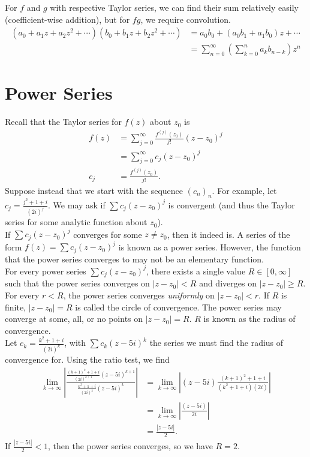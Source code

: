 \documentclass[10pt]{extarticle}
\begin{document}
  For $f$ and $g$ with respective Taylor series, we can find their sum relatively easily (coefficient-wise addition), but for $fg$, we require convolution.
  \begin{align*}
    \left(a_0 + a_1z + a_2z^2 + \cdots\right)\left(b_0 + b_1z + b_2z^2 + \cdots\right) &= a_0b_0 + (a_0b_1 + a_1b_0)z + \cdots\\
                 &= \sum_{n=0}^{\infty}\left(\sum_{k=0}^{n}a_kb_{n-k}\right)z^n
  \end{align*}
  \section{Power Series}%
  Recall that the Taylor series for $f(z)$ about $z_0$ is
  \begin{align*}
    f(z) &= \sum_{j=0}^{\infty}\frac{f^{(j)}(z_0)}{j!}(z-z_0)^j\\
         &= \sum_{j=0}^{\infty}c_j(z-z_0)^j\\
    c_j &= \frac{f^{(j)}(z_0)}{j!}.
  \end{align*}
  Suppose instead that we start with the sequence $(c_n)_n$. For example, let $c_j = \frac{j^2 + 1 + i}{(2i)^j}$. We may ask if $\sum c_j(z-z_0)^j$ is convergent (and thus the Taylor series for some analytic function about $z_0$).\\

  If $\sum c_j(z-z_0)^j$ converges for some $z\neq z_0$, then it indeed is. A series of the form $f(z) = \sum c_j(z-z_0)^j$ is known as a power series. However, the function that the power series converges to may not be an elementary function.\\

  For every power series $\sum c_j(z-z_0)^j$, there exists a single value $R\in [0,\infty]$ such that the power series converges on $|z-z_0| < R$ and diverges on $|z-z_0| \geq R$. For every $r < R$, the power series converges \textit{uniformly} on $|z-z_0| < r$. If $R$ is finite, $|z-z_0| = R$ is called the circle of convergence. The power series may converge at some, all, or no points on $|z-z_0| = R$. $R$ is known as the radius of convergence.\\

  Let $c_k = \frac{k^2 + 1 + i}{(2i)^k}$, with $\sum c_k (z-5i)^k$ the series we must find the radius of convergence for. Using the ratio test, we find
  \begin{align*}
    \lim_{k\rightarrow\infty}\left|\frac{\frac{(k+1)^2 + 1 + i}{(2i)^{k+1}}(z-5i)^{k+1}}{\frac{k^2 + 1 + i}{(2i)^k}(z-5i)^k}\right| &= \lim_{k\rightarrow\infty}\left|(z-5i)\frac{(k+1)^2 + 1 + i}{(k^2 + 1 + i)(2i)}\right|\\
                              &= \lim_{k\rightarrow\infty}\left|\frac{(z-5i)}{2i} \right|\\
                              &= \frac{|z-5i|}{2}.
  \end{align*}
  If $\frac{|z-5i|}{2} < 1$, then the power series converges, so we have $R = 2$.\\
\end{document}
